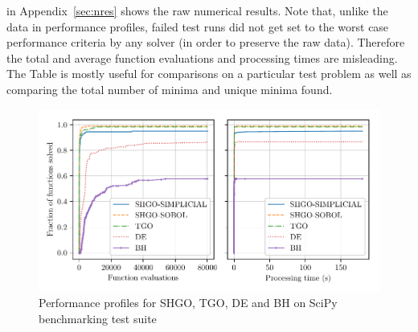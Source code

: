  in Appendix~\ref{sec:nres} shows the raw numerical results. Note that, unlike the data in performance profiles, failed test runs did not get set to the worst case performance criteria by any solver (in order to preserve the raw data). Therefore the total and average function evaluations and processing times are misleading. The Table is mostly useful for comparisons on a particular test problem as well as comparing the total number of minima and unique minima found.





\begin{figure} %
\centerline{\includegraphics[scale=1.0]{./Fig12.pdf}}
{\caption{Performance profiles for SHGO, TGO, DE and BH on SciPy benchmarking test suite} \label{fig:pprofile}} 
\end{figure}

